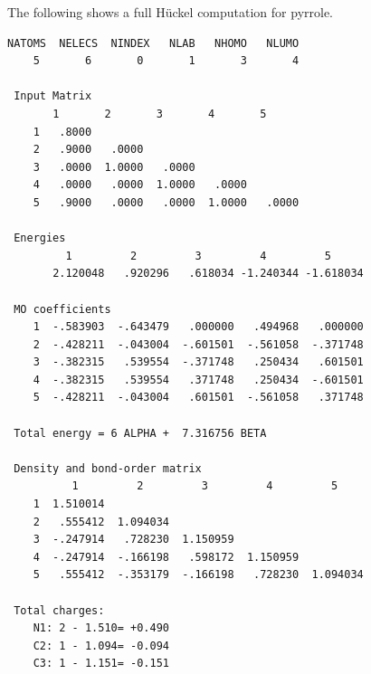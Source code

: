 \documentclass[../Main/chem532-notes.tex]{subfiles}
\begin{document}
\begin{example}
The following shows a full H\"{u}ckel computation for pyrrole. 
\begin{verbatim}
NATOMS  NELECS  NINDEX   NLAB   NHOMO   NLUMO
    5       6       0       1       3       4

 Input Matrix
       1       2       3       4       5
    1   .8000
    2   .9000   .0000
    3   .0000  1.0000   .0000
    4   .0000   .0000  1.0000   .0000
    5   .9000   .0000   .0000  1.0000   .0000

 Energies
         1         2         3         4         5
       2.120048   .920296   .618034 -1.240344 -1.618034

 MO coefficients
    1  -.583903  -.643479   .000000   .494968   .000000
    2  -.428211  -.043004  -.601501  -.561058  -.371748
    3  -.382315   .539554  -.371748   .250434   .601501
    4  -.382315   .539554   .371748   .250434  -.601501
    5  -.428211  -.043004   .601501  -.561058   .371748

 Total energy = 6 ALPHA +  7.316756 BETA

 Density and bond-order matrix
          1         2         3         4         5
    1  1.510014
    2   .555412  1.094034
    3  -.247914   .728230  1.150959
    4  -.247914  -.166198   .598172  1.150959
    5   .555412  -.353179  -.166198   .728230  1.094034

 Total charges:
    N1: 2 - 1.510= +0.490
    C2: 1 - 1.094= -0.094
    C3: 1 - 1.151= -0.151
\end{verbatim}
\end{example}
\end{document}
